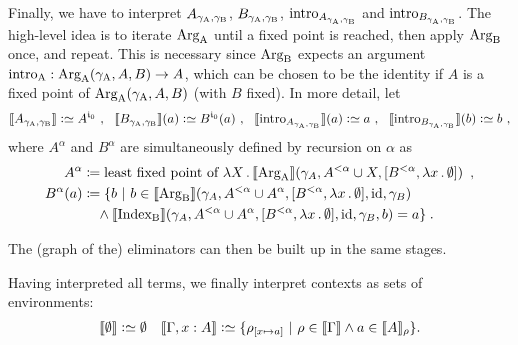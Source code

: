 \documentclass{article}
\begin{document}
Finally, we have to interpret $A_{\gamma_{\mathrm{A}}, \gamma_{\mathrm{B}}}$, $B_{\gamma_{\mathrm{A}}, \gamma_{\mathrm{B}}}$,
$\text{intro}_{A_{\gamma_{\mathrm{A}}, \gamma_{\mathrm{B}}}}$ and $\text{intro}_{B_{\gamma_{\mathrm{A}}, \gamma_{\mathrm{B}}}}$.  The high-level
idea is to iterate $\text{Arg}_{\mathrm{A}}$ until a fixed point is reached, then apply
$\text{Arg}_{\mathrm{B}}$ once, and repeat. This is necessary since $\text{Arg}_{\mathrm{B}}$ expects an
argument $\text{intro}_{\mathrm{A}} : \text{Arg}_{\mathrm{A}}(\gamma_{\mathrm{A}}, A, B) \to A$, which can be chosen
to be the identity if $A$ is a fixed point of $\text{Arg}_{\mathrm{A}}(\gamma_{\mathrm{A}}, A, B)$
(with $B$ fixed). In more detail, let
\begin{gather*}
\sem{A_{\gammaAB}} \colonsimeq A^{\cardz} \enspace\! , \quad\!\!
\sem{B_{\gammaAB}}(a) \colonsimeq B^{\cardz}(a)\enspace\! , \quad\!\!
\sem{\intro{A_{\gammaAB}}}(a) \colonsimeq a \enspace\! ,\quad\!\!
\sem{\intro{B_{\gammaAB}}}(b) \colonsimeq b \enspace\! ,\\
\end{gather*} \vskip -0.5cm \noindent 
where $A^{\alpha}$ and $B^{\alpha}$ are
simultaneously defined by recursion on $\alpha$ as
\begin{align*}
  A^{\alpha} & \coloneqq  \text{least fixed point of }
       \lambda X\,.\, \llbracket \text{Arg}_{\mathrm{A}} \rrbracket(\gamma_A, A^{< \alpha} \cup X, [B^{< \alpha}, \lambda x\,.\,\emptyset]) \enspace ,\\
  B^{\alpha}(a) & \coloneqq \{b\ |\ b \in \llbracket \text{Arg}_{\mathrm{B}} \rrbracket(\gamma_A, A^{< \alpha} \cup A^{\alpha},
  [B^{< \alpha}, \lambda x\,.\,\emptyset], \text{id}, \gamma_B) \\
  & \quad \land \llbracket \text{Index}_{\mathrm{B}} \rrbracket(\gamma_A,
  A^{< \alpha} \cup A^{\alpha}, [B^{< \alpha}, \lambda x\,.\,\emptyset], \text{id}, \gamma_B, b) = a \}\enspace \hspace{-2.47968pt} .
\end{align*}

The (graph of the) eliminators can then be built up in the same
stages.

Having interpreted all terms, we finally interpret contexts as sets of environments:
\begin{align*}
  \llbracket \emptyset \rrbracket \mathrel{\mathop:}\simeq \emptyset && \llbracket \Gamma, x : A \rrbracket \mathrel{\mathop:}\simeq \{
  \rho_{[x \mapsto a]} \ |\ \rho \in \llbracket \Gamma \rrbracket \land a \in \llbracket A \rrbracket_\rho\}.
\end{align*}
\end{document}
